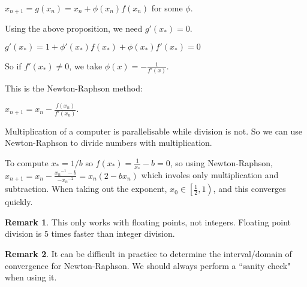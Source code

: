 \documentclass[12pt,a4paper]{article}
\theoremstyle{definition}
\newtheorem*{remark}{Remark}
\begin{document}
$x_{n + 1} = g(x_n) = x_n + \phi (x_n) f(x_n)$ for some $\phi$.

Using the above proposition, we need $g'(x_*) = 0$.

$g'(x_*) = 1 + \phi'(x_*)f(x_*) + \phi(x_*)f'(x_*) = 0$

So if $f'(x_*) \ne 0$, we take $\phi(x) = -\frac{1}{f'(x)}$.

This is the Newton-Raphson method:

$x_{n + 1} = x_n - \frac{f(x_n)}{f'(x_n)}$.

Multiplication of a computer is parallelisable while division is not. So we can use Newton-Raphson to divide numbers with multiplication.

To compute $x_* = 1 / b$ so $f(x_*) = \frac{1}{x_*} - b = 0$, so using Newton-Raphson, $x_{n + 1} = x_n - \frac{{x_n}^{-1} - b}{-{x_n}^{-2}} = x_n (2 - b x_n)$ which involes only multiplication and subtraction. When taking out the exponent, $x_0 \in \left[ \frac{1}{2}, 1 \right)$, and this converges quickly.

\begin{remark}
	This only works with floating points, not integers. Floating point division is 5 times faster than integer division.
\end{remark}

\begin{remark}
	It can be difficult in practice to determine the interval/domain of convergence for Newton-Raphson. We should always perform a ``sanity check" when using it.
\end{remark}
\end{document}
